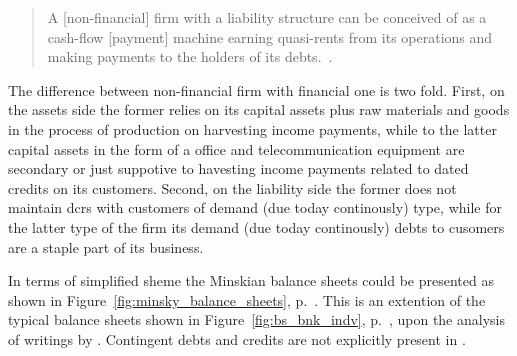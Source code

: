 \begin{quote}
A [non-financial] firm with a liability structure can be conceived of as a cash-flow [payment] machine earning quasi-rents from its operations and making payments to the holders of its debts.~\citep[p.~228]{minsky1986}.
\end{quote}

The difference between non-financial firm with financial one is two fold. First, on the assets side the former relies on its capital assets plus raw materials and goods in the process of production on harvesting income payments, while to the latter capital assets in the form of a office and telecommunication equipment are secondary or just suppotive to havesting income payments related to dated credits on its customers. Second, on the liability side the former does not maintain \acfp{dcr} with customers of demand (due today continously) type, while for the latter type of the firm its demand (due today continously) debts to cusomers are a staple part of its business.

In terms of simplified sheme the Minskian balance sheets could be presented as shown in Figure~\ref{fig:minsky_balance_sheets}, p.~\pageref{fig:minsky_balance_sheets}. This is an extention of the typical balance sheets shown in Figure~\ref{fig:bs_bnk_indv}, p.~\pageref{fig:bs_bnk_indv}, upon the analysis of writings by \citeauthor{innes1913}. Contingent debts and credits are not explicitly present in \citep{innes1913,innes1914}.

